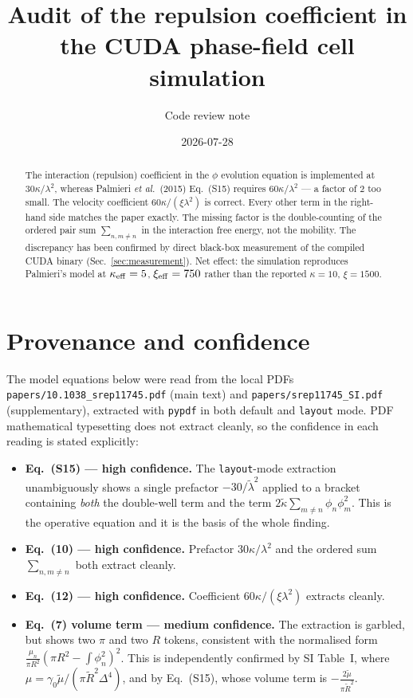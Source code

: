\documentclass[11pt]{article}
\title{Audit of the repulsion coefficient in the CUDA phase-field cell simulation}
\author{Code review note}
\date{2026-07-28}
\begin{document}
\maketitle

\begin{abstract}
\noindent
The interaction (repulsion) coefficient in the $\phi$ evolution equation is
implemented at $30\kappa/\lambda^2$, whereas Palmieri \emph{et al.}\ (2015)
Eq.~(S15) requires $60\kappa/\lambda^2$ --- a factor of $2$ too small. The
velocity coefficient $60\kappa/(\xi\lambda^2)$ is correct. Every other term in
the right-hand side matches the paper exactly. The missing factor is the
double-counting of the ordered pair sum $\sum_{n,m\neq n}$ in the interaction
free energy, not the mobility. The discrepancy has been confirmed by direct
black-box measurement of the compiled CUDA binary
(Sec.~\ref{sec:measurement}). Net effect: the simulation reproduces Palmieri's
model at $\kappa_{\rm eff}=5$, $\xi_{\rm eff}=750$ rather than the reported
$\kappa=10$, $\xi=1500$.
\end{abstract}

\section{Provenance and confidence}

The model equations below were read from the local PDFs
\texttt{papers/10.1038\_srep11745.pdf} (main text) and
\texttt{papers/srep11745\_SI.pdf} (supplementary), extracted with
\texttt{pypdf} in both default and \texttt{layout} mode. PDF mathematical
typesetting does not extract cleanly, so the confidence in each reading is
stated explicitly:

\begin{itemize}
\item \textbf{Eq.~(S15) --- high confidence.} The \texttt{layout}-mode
  extraction unambiguously shows a single prefactor $-30/\tilde\lambda^2$
  applied to a bracket containing \emph{both} the double-well term and the
  term $2\tilde\kappa\sum_{m\neq n}\phi_n\phi_m^2$. This is the operative
  equation and it is the basis of the whole finding.
\item \textbf{Eq.~(10) --- high confidence.} Prefactor $30\kappa/\lambda^2$ and
  the ordered sum $\sum_{n,m\neq n}$ both extract cleanly.
\item \textbf{Eq.~(12) --- high confidence.} Coefficient $60\kappa/(\xi\lambda^2)$
  extracts cleanly.
\item \textbf{Eq.~(7) volume term --- medium confidence.} The extraction is
  garbled, but shows two $\pi$ and two $R$ tokens, consistent with the
  normalised form $\frac{\mu_n}{\pi R^2}(\pi R^2 - \int\phi_n^2)^2$. This is
  independently confirmed by SI Table~I, where $\mu = \gamma_0\tilde\mu /
  (\pi\tilde R^2\Delta^4)$, and by Eq.~(S15), whose volume term is
  $-\frac{2\tilde\mu}{\pi\tilde R^2}$.
\end{itemize}
\end{document}
